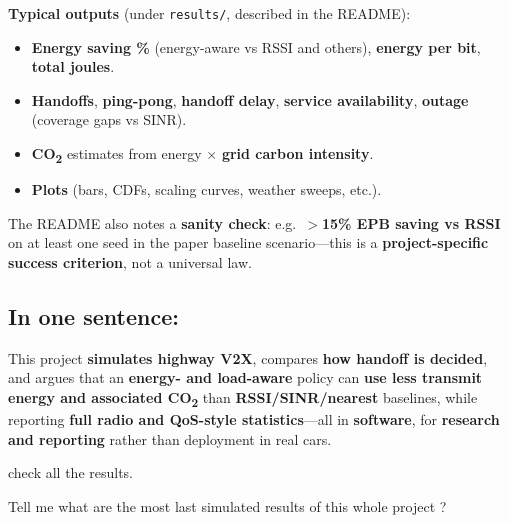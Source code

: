 \documentclass[11pt,a4paper]{article}
\begin{document}
\begin{assistmsg}
\textbf{Typical outputs} (under \texttt{results/}, described in the README):

\begin{itemize}
\item \textbf{Energy saving \%} (energy-aware vs RSSI and others), \textbf{energy per bit}, \textbf{total joules}.
\item \textbf{Handoffs}, \textbf{ping-pong}, \textbf{handoff delay}, \textbf{service availability}, \textbf{outage} (coverage gaps vs SINR).
\item \textbf{CO\textsubscript{2}} estimates from energy $\times$ \textbf{grid carbon intensity}.
\item \textbf{Plots} (bars, CDFs, scaling curves, weather sweeps, etc.).
\end{itemize}

The README also notes a \textbf{sanity check}: e.g.\ \textbf{$>$15\% EPB saving vs RSSI} on at least one seed in the paper baseline scenario---this is a \textbf{project-specific success criterion}, not a universal law.

\subsection*{In one sentence:}

This project \textbf{simulates highway V2X}, compares \textbf{how handoff is decided}, and argues that an \textbf{energy- and load-aware} policy can \textbf{use less transmit energy and associated CO\textsubscript{2}} than \textbf{RSSI/SINR/nearest} baselines, while reporting \textbf{full radio and QoS-style statistics}---all in \textbf{software}, for \textbf{research and reporting} rather than deployment in real cars.
\end{assistmsg}

\begin{usermsg}
check all the results.

Tell me what are the most last simulated results of this whole project ?
\end{usermsg}
\end{document}
